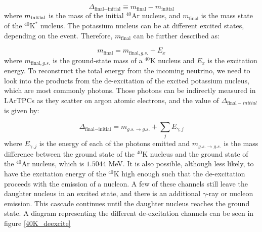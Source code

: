  \begin{equation}
    \Delta_{\textrm{final}-\textrm{initial}} \equiv m_{\textrm{final}} - m_{\textrm{initial}}  
    \label{delta_fi}
\end{equation}
where $m_\textrm{\textrm{initial}}$ is the mass of the initial $^{40}$Ar nucleus, and $m_{\textrm{final}}$ is the mass state of the $^{40}\textrm{K}^{*}$ nucleus. The potassium nucleus can be at different excited states, depending on the event. Therefore, $m_{\textrm{final}}$ can be further described as:

\begin{equation}
    m_{\textrm{final}} = m_{\textrm{final}, g.s.} + E_x
    \label{mfinal}
\end{equation}
where $m_{\textrm{final}, g.s.}$ is the ground-state mass of a $^{40}$K nucleus and $E_x$ is the excitation energy. To reconstruct the total energy from the incoming neutrino, we need to look into the products from the de-excitation of the excited potassium nucleus, which are most commonly photons. Those photons can be indirectly measured in LArTPCs as they scatter on argon atomic electrons, and the value of $\Delta_{\textrm{final}-initial}$ is given by:

\begin{equation}
    \Delta_{\textrm{final}-\textrm{initial}} = m_{g.s. \rightarrow g.s.} + \sum_{j}E_{\gamma, j}   
    \label{delta_fi_2}
\end{equation}
where $E_{\gamma,j}$ is the energy of each of the photons emitted and $m_{g.s. \rightarrow g.s.}$ is the mass difference between the ground state of the $^{40}$K nucleus and the ground state of the $^{40}$Ar nucleus, which is $1.5044$ MeV. 
It is also possible, although less likely, to have the excitation energy of the $^{40}$K high enough such that the de-excitation proceeds with the emission of a nucleon. A few of these channels still leave the daughter nucleus in an excited state, and there is an additional $\gamma$-ray or nucleon emission. This cascade continues until the daughter nucleus reaches the ground state. A diagram representing the different de-excitation channels can be seen in figure \ref{40K_deexcite}

